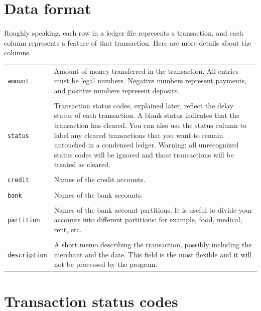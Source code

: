 \documentclass{article}
\begin{document}
\begin{flushleft}
\section{Data format}

\paragraph{} Roughly speaking, each row in a ledger file represents a transaction, and each column represents a feature of that transaction. Here are more details about the columns.

\begin{center}
\begin{tabular}{lp{11cm}}
 {\tt amount} & Amount of money transferred in the transaction. All entries must be legal numbers. Negative numbers represent payments, and positive numbers represent deposits. \\ \\

{\tt status} & Transaction status codes, explained later, reflect the delay status of each transaction. A blank status indicates that the transaction has cleared. You can also use the status column to label any cleared transactions that you want to remain untouched in a condensed ledger. Warning: all unrecognized status codes will be ignored and those transactions will be treated as cleared. \\ \\

{\tt credit} & Names of the credit accounts. \\ \\

{\tt bank} & Names of the bank accounts. \\ \\

{\tt partition} & Names of the bank account partitions. It is useful to divide your accounts into different partitions: for example, food, medical, rent, etc. \\ \\

{\tt description} & A short memo describing the transaction, possibly including the merchant and the date. This field is the most flexible and it will not be processed by the program.
 
\end{tabular}
\end{center}

\section{Transaction status codes} \label{sec:codes}


\end{flushleft}
\end{document}

